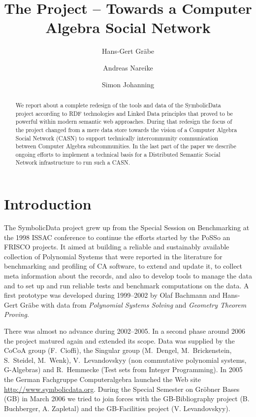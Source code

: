 \documentclass{llncs}
\title{The {\SD} Project -- Towards a Computer Algebra Social Network}
\author{Hans-Gert Gr\"abe \and Andreas Nareike\and Simon Johanning}
\institute{Universit\"at Leipzig, Germany\\
\email{(graebe|nareike|johanning)@informatik.uni-leipzig.de}}
\newcommand{\SD}{{\sc Symbolic\-Data}}
\begin{document}
\maketitle

\begin{abstract}
  We report about a complete redesign of the tools and data of the {\SD}
  project according to RDF technologies and Linked Data principles that proved
  to be powerful within modern semantic web approaches. During that redesign
  the focus of the project changed from a mere data store towards the vision
  of a Computer Algebra Social Network (CASN) to support technically
  intercommunity communication between Computer Algebra subcommunities.  In
  the last part of the paper we describe ongoing efforts to implement a
  technical basis for a Distributed Semantic Social Network infrastructure to
  run such a CASN.
\end{abstract}

\section{Introduction}

The SymbolicData project grew up from the Special Session on Benchmarking at
the 1998 ISSAC conference to continue the efforts started by the PoSSo
\cite{PoSSo} an FRISCO \cite{FRISCO} projects. It aimed at building a reliable
and sustainably available collection of Polynomial Systems that were reported
in the literature for benchmarking and profiling of CA software, to extend and
update it, to collect meta information about the records, and also to develop
tools to manage the data and to set up and run reliable tests and benchmark
computations on the data.  A first prototype was developed during 1999--2002
by Olaf Bachmann and Hans-Gert Gr\"abe with data from \emph{Polynomial Systems
  Solving} and \emph{Geometry Theorem Proving}.

There was almost no advance during 2002--2005. In a second phase around 2006
the project matured again and extended its scope. Data was supplied by the
CoCoA group (F.~Cioffi), the Singular group (M.~Dengel, M.~Brickenstein,
S.~Steidel, M.~Wenk), V.~Levandovskyy (non commutative polynomial systems,
G-Algebras) and R.~Hemmecke (Test sets from Integer Programming). In 2005 the
German Fachgruppe Computeralgebra launched the Web site
\url{http://www.symbolicdata.org}.  During the Special Semester on Gr\"obner
Bases (GB) in March 2006 we tried to join forces with the GB-Bibliography
project (B. Buchberger, A. Zapletal) and the GB-Facilities project
(V. Levandovskyy).
\end{document}
